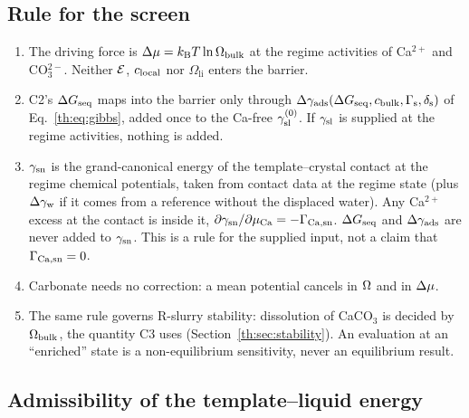 \subsection{Rule for the screen}\label{th:sec:rule}

\begin{enumerate}
\item The driving force is $\Delta\mu=k_\mathrm{B} T\ln\Omega_\mathrm{bulk}$ at the regime activities of Ca$^{2+}$ and
CO$_3^{2-}$. Neither $\mathcal{E}$, $c_\mathrm{local}$ nor $\Omega_\mathrm{li}$ enters the barrier.
\item C2's $\Delta G_\mathrm{seq}$ maps into the barrier only through $\Delta\gamma_\mathrm{ads}(\Delta G_\mathrm{seq},c_\mathrm{bulk},\Gamma_\mathrm{s},\delta_\mathrm{s})$ of
Eq.~\eqref{th:eq:gibbs}, added once to the Ca-free $\gamma_\mathrm{sl}^{(0)}$. If $\gamma_\mathrm{sl}$ is supplied at the regime
activities, nothing is added.
\item $\gamma_\mathrm{sn}$ is the grand-canonical energy of the template--crystal contact at the regime chemical
potentials, taken from contact data at the regime state (plus $\Delta\gamma_\mathrm{w}$ if it comes from a reference
without the displaced water). Any Ca$^{2+}$ excess at the contact is inside it,
$\partial\gamma_\mathrm{sn}/\partial\mu_\mathrm{Ca}=-\Gamma_\mathrm{Ca,sn}$. $\Delta G_\mathrm{seq}$ and $\Delta\gamma_\mathrm{ads}$ are never added to $\gamma_\mathrm{sn}$. This
is a rule for the supplied input, not a claim that $\Gamma_\mathrm{Ca,sn}=0$.
\item Carbonate needs no correction: a mean potential cancels in $\Omega$ and in $\Delta\mu$.
\item The same rule governs R-slurry stability: dissolution of CaCO$_3$ is decided by $\Omega_\mathrm{bulk}$, the quantity C3 uses (Section~\ref{th:sec:stability}). An
evaluation at an ``enriched'' state is a non-equilibrium sensitivity, never an equilibrium result.
\end{enumerate}

\subsection{Admissibility of the template--liquid energy}\label{th:sec:admissibility}

